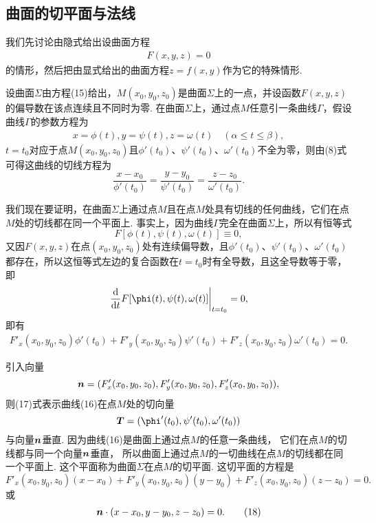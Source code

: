 \subsection{曲面的切平面与法线}
我们先讨论由隐式给出设曲面方程\begin{gather}
F(x,y,z)=0
\tag{15}
\end{gather}的情形，然后把由显式给出的曲面方程\(z = f(x,y)\)作为它的特殊情形.

设曲面\(\Sigma\)由方程(15)给出，\(M(x_0,y_0,z_0)\)是曲面\(\Sigma\)上的一点，并设函数\(F(x,y,z)\)的偏导数在该点连续且不同时为零.
在曲面\(\Sigma\)上，通过点\(M\)任意引一条曲线\(\Gamma\)，假设曲线\(\Gamma\)的参数方程为\begin{gather}
x = \phi(t),
y = \psi(t),
z = \omega(t)
\quad (\alpha \leq t \leq \beta),
\tag{16}
\end{gather}
\(t = t_0\)对应于点\(M(x_0,y_0,z_0)\)且\(\phi'(t_0)\)、\(\psi'(t_0)\)、\(\omega'(t_0)\)不全为零，则由(8)式可得这曲线的切线方程为\[
\frac{x-x_0}{\phi'(t_0)}
=\frac{y-y_0}{\psi'(t_0)}
=\frac{z-z_0}{\omega'(t_0)}.
\]

我们现在要证明，在曲面\(\Sigma\)上通过点\(M\)且在点\(M\)处具有切线的任何曲线，它们在点\(M\)处的切线都在同一个平面上.
事实上，因为曲线\(\Gamma\)完全在曲面\(\Sigma\)上，所以有恒等式\[
F[\phi(t),\psi(t),\omega(t)] \equiv 0,
\]又因\(F(x,y,z)\)在点\((x_0,y_0,z_0)\)处有连续偏导数，且\(\phi'(t_0)\)、\(\psi'(t_0)\)、\(\omega'(t_0)\)都存在，所以这恒等式左边的复合函数在\(t = t_0\)时有全导数，且这全导数等于零，即\[
\eval{\dv{t} F[\phi(t),\psi(t),\omega(t)]}_{t=t_0} = 0,
\]即有\begin{gather}
F'_x(x_0,y_0,z_0) \phi'(t_0)
+ F'_y(x_0,y_0,z_0) \psi'(t_0)
+ F'_z(x_0,y_0,z_0) \omega'(t_0)
= 0.
\tag{17}
\end{gather}

引入向量\begin{equation}
	\boldsymbol{n}=(F'_x(x_0,y_0,z_0),F'_y(x_0,y_0,z_0),F'_z(x_0,y_0,z_0)),
\end{equation}
则(17)式表示曲线(16)在点\(M\)处的切向量\[
	\vb{T} = (\phi'(t_0),\psi'(t_0),\omega'(t_0))
\]与向量\(\boldsymbol{n}\)垂直.
因为曲线(16)是曲面上通过点\(M\)的任意一条曲线，
它们在点\(M\)的切线都与同一个向量\(\boldsymbol{n}\)垂直，
所以曲面上通过点\(M\)的一切曲线在点\(M\)的切线都在同一个平面上.
这个平面称为曲面\(\Sigma\)在点\(M\)的切平面.
这切平面的方程是\[
	F'_x(x_0,y_0,z_0) (x-x_0)
	+ F'_y(x_0,y_0,z_0) (y-y_0)
	+ F'_z(x_0,y_0,z_0) (z-z_0)
	= 0.
\]或\begin{gather}
	\boldsymbol{n}\cdot(x-x_0,y-y_0,z-z_0)=0.
	\tag{18}
\end{gather}

